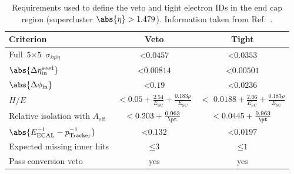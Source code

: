 \begin{table}[htbp]
    \centering
    \begin{tabular}{lcc}
    \hline
    Criterion & Veto & Tight \\\hline
    Full $\text{5} \times \text{5}$ $\sigma_{i\eta i\eta}$ & $< \text{0.0457}$ & $< \text{0.0353}$    \\
    $\abs{\Delta\eta_{\mathrm{in}}^{\mathrm{seed}}}$ & $< \text{0.00814}$ & $< \text{0.00501}$ \\
    $\abs{\Delta\phi_{\mathrm{in}}}$ & $< \text{0.19}$ & $< \text{0.0236}$ \\
    $H/E$ & $<\text{0.05} + \frac{\text{2.54}}{E_{\mathrm{SC}}} + \frac{\text{0.183}\rho}{E_{\mathrm{SC}}}$ & $<$ $\text{0.0188} + \frac{\text{2.06}}{E_{\mathrm{SC}}} + \frac{\text{0.183}\rho}{E_{\mathrm{SC}}}$ \\
    Relative isolation with $A_{\mathrm{eff.}}$ & $< \text{0.203} + \frac{\text{0.963}}{\pt}$ & $< \text{0.0445} + \frac{\text{0.963}}{\pt}$\\
    $\abs{E^{-1}_{\mathrm{ECAL}} - p^{-1}_{\mathrm{Tracker}}}$ & $< \text{0.132}$ & $< \text{0.0197}$\\
    Expected missing inner hits & $\leq \text{3}$ & $\leq \text{1}$\\
    Pass conversion veto & yes & yes \\
    \hline
    \end{tabular}
    \caption[Requirements used to define the veto and tight electron IDs in the end cap region (supercluster $\abs{\eta} > \text{1.479}$)]{Requirements used to define the veto and tight electron IDs in the end cap region (supercluster $\abs{\eta} > \text{1.479}$). Information taken from Ref.~.}
    \label{tab:htoinv_electron_ID_endcap}
\end{table}

